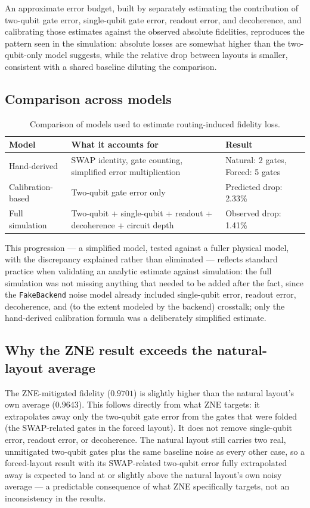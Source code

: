 \documentclass[11pt]{article}
\begin{document}
An approximate error budget, built by separately estimating the contribution of two-qubit gate error, single-qubit gate error, readout error, and decoherence, and calibrating those estimates against the observed absolute fidelities, reproduces the pattern seen in the simulation: absolute losses are somewhat higher than the two-qubit-only model suggests, while the relative drop between layouts is smaller, consistent with a shared baseline diluting the comparison.

\subsection{Comparison across models}

\begin{table}[H]
\centering
\caption{Comparison of models used to estimate routing-induced fidelity loss.}
\label{tab:model-comparison}
\begin{tabular}{lp{6.5cm}l}
\toprule
Model & What it accounts for & Result \\
\midrule
Hand-derived & SWAP identity, gate counting, simplified error multiplication & Natural: 2 gates, Forced: 5 gates \\
Calibration-based & Two-qubit gate error only & Predicted drop: 2.33\% \\
Full simulation & Two-qubit + single-qubit + readout + decoherence + circuit depth & Observed drop: 1.41\% \\
\bottomrule
\end{tabular}
\end{table}

This progression --- a simplified model, tested against a fuller physical model, with the discrepancy explained rather than eliminated --- reflects standard practice when validating an analytic estimate against simulation: the full simulation was not missing anything that needed to be added after the fact, since the \texttt{FakeBackend} noise model already included single-qubit error, readout error, decoherence, and (to the extent modeled by the backend) crosstalk; only the hand-derived calibration formula was a deliberately simplified estimate.

\subsection{Why the ZNE result exceeds the natural-layout average}

The ZNE-mitigated fidelity ($0.9701$) is slightly higher than the natural layout's own average ($0.9643$). This follows directly from what ZNE targets: it extrapolates away only the two-qubit gate error from the gates that were folded (the SWAP-related gates in the forced layout). It does not remove single-qubit error, readout error, or decoherence. The natural layout still carries two real, unmitigated two-qubit gates plus the same baseline noise as every other case, so a forced-layout result with its SWAP-related two-qubit error fully extrapolated away is expected to land at or slightly above the natural layout's own noisy average --- a predictable consequence of what ZNE specifically targets, not an inconsistency in the results.
\end{document}
